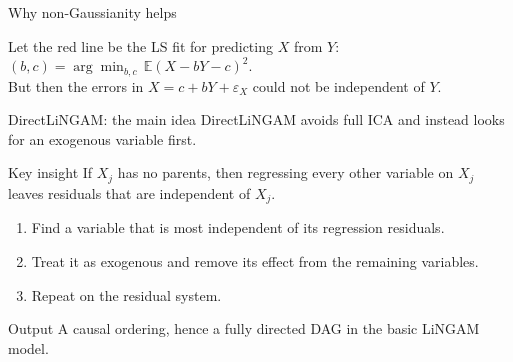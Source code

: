 \documentclass[dvipsnames,aspectratio=169,handout]{beamer}
\begin{document}
\begin{frame}{Why non-Gaussianity helps}
\begin{center}
\end{center}

\small
Let the red line be the LS fit for predicting $X$ from $Y$: $
(b,c)=\arg\min_{b,c}\,\mathbb{E}(X-bY-c)^2.
$\\[2mm]
But then the errors in $X=c+bY+\varepsilon_X$ \alert{could not be independent of $Y$}.
\end{frame}




\begin{frame}{DirectLiNGAM: the main idea}
DirectLiNGAM avoids full ICA and instead looks for an exogenous variable first.

\begin{block}{Key insight}
If $X_j$ has no parents, then regressing every other variable on $X_j$ leaves residuals that are independent of $X_j$.
\end{block}

\begin{enumerate}
    \item Find a variable that is most independent of its regression residuals.
    \item Treat it as exogenous and remove its effect from the remaining variables.
    \item Repeat on the residual system.
\end{enumerate}

\begin{alertblock}{Output}
A causal ordering, hence a fully directed DAG in the basic LiNGAM model.
\end{alertblock}
\end{frame}
\end{document}

